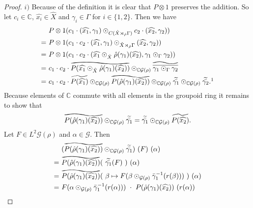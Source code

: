\documentclass[12pt,a4paper]{scrartcl}
\theoremstyle{plain}
\theoremstyle{definition}
\newcommand{\C}{\mathbb{C}} %
\newcommand{\2}{\mathbb{Z} / 2 \mathbb{Z}}
\newcommand{\G}{\mathcal{G}}
\newcommand{\1}{\bar{1}}
\newcommand{\0}{\bar{0}}
\newcommand{\reallywidetilde}[1]{\ThisStyle{%
		\setbox0=\hbox{$\SavedStyle#1$}%
		\stackengine{-.1\LMpt}{$\SavedStyle#1$}{%
			\stretchto{\scaleto{\SavedStyle\mkern.2mu\AC}{.5150\wd0}}{.6\ht0}%
		}{O}{c}{F}{T}{S}%
}}
\begin{document}
\begin{proof}
	$i)$ Because of the definition it is clear that $P \otimes 1$ preserves the addition. So let $c_i \in \C$, $\widehat{x_i} \in \hat{X}$ and $\gamma_i \in \Gamma$ for $i \in \{1,2\}$. Then we have
	\begin{align*}
		 &~ P \otimes 1(c_1 \cdot (\widehat{x_1}, \gamma_1) \odot_{C(\hat{X} \rtimes_{\hat{\rho}} \Gamma)} c_2 \cdot (\widehat{x_2}, \gamma_2))  \\
		=&~ P \otimes 1(c_1 \cdot  c_2 \cdot (\widehat{x_1}, \gamma_1) \odot_{\hat{X} \rtimes_{\hat{\rho}} \Gamma} (\widehat{x_2}, \gamma_2)) \\
		=&~ P \otimes 1(c_1 \cdot  c_2 \cdot (\widehat{x_1} \odot_{\hat{X}} \hat{\rho}(\gamma_1)(\widehat{x_2}), \gamma_1 \odot_{\Gamma} \gamma_2)) \\
		=&~ c_1 \cdot  c_2 \cdot \reallywidetilde{P(\widehat{x_1} \odot_{\hat{X}} \hat{\rho}(\gamma_1)(\widehat{x_2}))} \odot_{\C\G(\rho)} \reallywidetilde{\overline{\gamma_1 \odot_{\Gamma} \gamma_2}} \\
		=&~ c_1 \cdot  c_2 \cdot \widetilde{P(\widehat{x_1})} \odot_{\C\G(\rho)} \reallywidetilde{P(\hat{\rho}(\gamma_1)(\widehat{x_2}))} \odot_{\C\G(\rho)} \widetilde{\bar{\gamma_1}} \odot_{\C\G(\rho)} \widetilde{\bar{\gamma_2}}. \footnotemark
	\end{align*}
	Because elements of $\C$ commute with all elements in the groupoid ring it remains to show that 
	\begin{align*}
		\reallywidetilde{P(\hat{\rho}(\gamma_1)(\widehat{x_2}))} \odot_{\C\G(\rho)} \widetilde{\bar{\gamma_1}} = \widetilde{\bar{\gamma_1}} \odot_{\C\G(\rho)} \widetilde{P(\widehat{x_2})}.
	\end{align*}
	Let $F \in L^2 \G(\rho)$ and $\alpha \in \G$. Then
	\begin{align*}
		 &~ (\reallywidetilde{P(\hat{\rho}(\gamma_1)(\widehat{x_2}))} \odot_{\C\G(\rho)} \widetilde{\bar{\gamma_1}})~(F)~(\alpha) \\
		=&~ \reallywidetilde{P(\hat{\rho}(\gamma_1)(\widehat{x_2}))}(~\widetilde{\bar{\gamma_1}}(F)~)~(\alpha) \\
		=&~ \reallywidetilde{P(\hat{\rho}(\gamma_1)(\widehat{x_2}))}(~\beta \mapsto F(\beta \odot_{\G (\rho)} \bar\gamma_1^{-1}(r(\beta)))~)~(\alpha) \\
		=&~ F(\alpha \odot_{\G (\rho)} \bar\gamma_1^{-1}(r(\alpha))) ~ \cdot ~ P(\hat{\rho}(\gamma_1)(\widehat{x_2}))~(r(\alpha))\\

\end{align*}
\end{proof}
\end{document}
